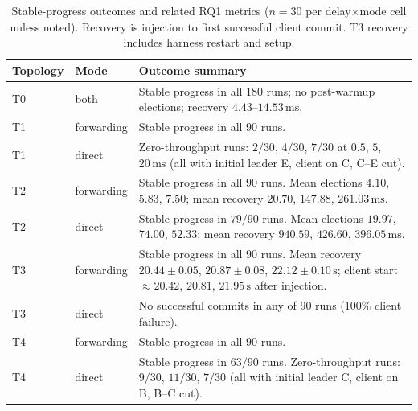 \begin{table}[H]
  \centering
  \caption{Stable-progress outcomes and related RQ1 metrics (\(n=30\) per delay\(\times\)mode cell unless noted). Recovery is injection to first successful client commit. T3 recovery includes harness restart and setup.}
  \label{tab:progress-recovery}
  \footnotesize
  \begin{tabular}{llp{5.8cm}}
    \toprule
    Topology & Mode & Outcome summary \\
    \midrule
    T0 & both & Stable progress in all \(180\) runs; no post-warmup elections; recovery \(4.43\)--\(14.53\,\mathrm{ms}\). \\
    T1 & forwarding & Stable progress in all \(90\) runs. \\
    T1 & direct & Zero-throughput runs: \(2/30\), \(4/30\), \(7/30\) at \(0.5\), \(5\), \(20\,\mathrm{ms}\) (all with initial leader E, client on C, C--E cut). \\
    T2 & forwarding & Stable progress in all \(90\) runs. Mean elections \(4.10\), \(5.83\), \(7.50\); mean recovery \(20.70\), \(147.88\), \(261.03\,\mathrm{ms}\). \\
    T2 & direct & Stable progress in \(79/90\) runs. Mean elections \(19.97\), \(74.00\), \(52.33\); mean recovery \(940.59\), \(426.60\), \(396.05\,\mathrm{ms}\). \\
    T3 & forwarding & Stable progress in all \(90\) runs. Mean recovery \(20.44\pm0.05\), \(20.87\pm0.08\), \(22.12\pm0.10\,\mathrm{s}\); client start \(\approx 20.42\), \(20.81\), \(21.95\,\mathrm{s}\) after injection. \\
    T3 & direct & No successful commits in any of \(90\) runs (\(100\%\) client failure). \\
    T4 & forwarding & Stable progress in all \(90\) runs. \\
    T4 & direct & Stable progress in \(63/90\) runs. Zero-throughput runs: \(9/30\), \(11/30\), \(7/30\) (all with initial leader C, client on B, B--C cut). \\
    \bottomrule
  \end{tabular}
\end{table}


